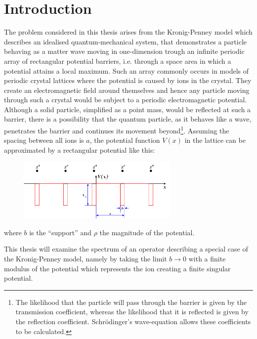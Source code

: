 \chapter{Introduction}

The problem considered in this thesis arises from the Kronig-Penney model which describes an idealised quantum-mechanical system, that demonstrates a particle behaving as a matter wave moving in one-dimension trough an infinite periodic array of rectangular potential barriers, i.e. through a space area in which a potential attains a local maximum. Such an array commonly occurs in models of periodic crystal lattices where the potential is caused by ions in the crystal. They create an electromagnetic field around themselves and hence any particle moving through such a crystal would be subject to a periodic electromagnetic potential. Although a solid particle, simplified as a point mass, would be reflected at such a barrier, there is a possibility that the quantum particle, as it behaves like a wave, penetrates the barrier and continues its movement beyond\footnote{The likelihood that the particle will pass through the barrier is given by the transmission coefficient, whereas the likelihood that it is reflected is given by the reflection coefficient. Schrödinger's wave-equation allows these coefficients to be calculated.}. Assuming the spacing between all ions is $a$, the potential function $V(x)$ in the lattice can be approximated by a rectangular potential like this:

\begin{figure}[h!] \centering
	  \includegraphics[width=0.7\textwidth]{Periodic_square_potential_130707} %
\end{figure}

where $b$ is the \enquote{support} and $\rho$ the magnitude of the potential.

This thesis will examine the spectrum of an operator describing a special case of the Kronig-Penney model, namely by taking the limit $b \rightarrow 0$ with a finite modulus of the potential which represents the ion creating a finite singular potential. 

